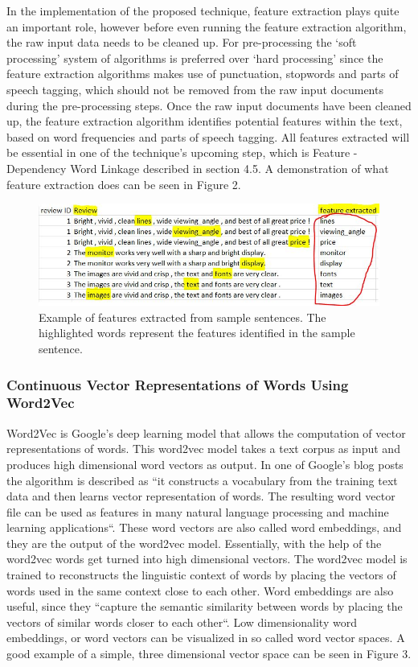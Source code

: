 \documentclass{sig-alternate}
\begin{document}
In the implementation of the proposed technique, feature extraction plays quite an important role, however before even running the feature extraction algorithm, the raw input data needs to be cleaned up. For pre-processing the `soft processing' system of algorithms is preferred over `hard processing' since the feature extraction algorithms makes use of punctuation, stopwords and parts of speech tagging, which should not be removed from the raw input documents during the pre-processing steps. Once the raw input documents have been cleaned up, the feature extraction algorithm identifies potential features within the text, based on word frequencies and parts of speech tagging. All features extracted will be essential in one of the technique's upcoming step, which is Feature - Dependency Word Linkage described in section 4.5. A demonstration of what feature extraction does can be seen in Figure 2.

\begin{figure}
\centering
\includegraphics[scale=0.60]{images/feature_extraction.JPG}
\caption{Example of features extracted from sample sentences. The highlighted words represent the features identified in the sample sentence.}
\end{figure}

\subsubsection{Continuous Vector Representations of Words Using Word2Vec}
Word2Vec is Google's deep learning model that allows the computation of vector representations of words. This word2vec model takes a text corpus as input and produces high dimensional word vectors as output. In one of Google's blog posts the algorithm is described as ``it constructs a vocabulary from the training text data and then learns vector representation of words. The resulting word vector file can be used as features in many natural language processing and machine learning applications``\cite{MikolovSutskeverLe2013}. 
These word vectors are also called word embeddings, and they are the output of the word2vec model. Essentially, with the help of the word2vec words get turned into high dimensional vectors. The word2vec model is trained to reconstructs the linguistic context of words by placing the vectors of words used in the same context close to each other. Word embeddings are also useful, since they ``capture the semantic similarity between words by placing the vectors of similar words closer to each other``\cite{MikolovSutskeverLe2013}. Low dimensionality word embeddings, or word vectors can be visualized in so called word vector spaces. A good example of a simple, three dimensional vector space can be seen in Figure 3.
\end{document}

